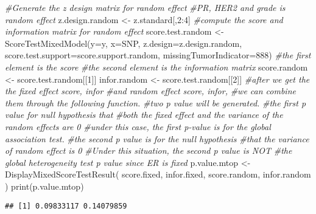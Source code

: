 \documentclass[11pt,]{article}
\newenvironment{Shaded}{\begin{snugshade}}{\end{snugshade}}
\newcommand{\AttributeTok}[1]{\textcolor[rgb]{0.77,0.63,0.00}{#1}}
\newcommand{\CommentTok}[1]{\textcolor[rgb]{0.56,0.35,0.01}{\textit{#1}}}
\newcommand{\DecValTok}[1]{\textcolor[rgb]{0.00,0.00,0.81}{#1}}
\newcommand{\FunctionTok}[1]{\textcolor[rgb]{0.00,0.00,0.00}{#1}}
\newcommand{\NormalTok}[1]{#1}
\newcommand{\OtherTok}[1]{\textcolor[rgb]{0.56,0.35,0.01}{#1}}
\newcommand{\SpecialCharTok}[1]{\textcolor[rgb]{0.00,0.00,0.00}{#1}}
\begin{document}
\begin{Shaded}
\begin{Highlighting}[]
\CommentTok{\#Generate the z design matrix for random effect}
\CommentTok{\#PR, HER2 and grade is random effect}
\NormalTok{z.design.random }\OtherTok{\textless{}{-}}\NormalTok{ z.standard[,}\DecValTok{2}\SpecialCharTok{:}\DecValTok{4}\NormalTok{]}
\CommentTok{\#compute the score and information matrix for random effect}
\NormalTok{score.test.random }\OtherTok{\textless{}{-}} \FunctionTok{ScoreTestMixedModel}\NormalTok{(}\AttributeTok{y=}\NormalTok{y,}
                                         \AttributeTok{x=}\NormalTok{SNP,}
                                         \AttributeTok{z.design=}\NormalTok{z.design.random,}
                                         \AttributeTok{score.test.support=}\NormalTok{score.support.random,}
                                         \AttributeTok{missingTumorIndicator=}\DecValTok{888}\NormalTok{)}
\CommentTok{\#the first element is the score}
\CommentTok{\#the second element is the information matrix}
\NormalTok{score.random }\OtherTok{\textless{}{-}}\NormalTok{ score.test.random[[}\DecValTok{1}\NormalTok{]]}
\NormalTok{infor.random }\OtherTok{\textless{}{-}}\NormalTok{ score.test.random[[}\DecValTok{2}\NormalTok{]]}
\CommentTok{\#after we get the the fixed effect score, infor }
\CommentTok{\#and random effect score, infor, }
\CommentTok{\#we can combine them through the following function. }
\CommentTok{\#two p value will be generated.}
\CommentTok{\#the first p value for null hypothesis that}
\CommentTok{\#both the fixed effect and the variance of the random effects are 0}
\CommentTok{\#under this case, the first p{-}value is for the global association test.}
\CommentTok{\#the second p value is for the null hypothesis }
\CommentTok{\#that the variance of random effect is 0}
\CommentTok{\#Under this situation, the second p value is NOT }
\CommentTok{\#the global heterogeneity test p value since ER is fixed}
\NormalTok{p.value.mtop }\OtherTok{\textless{}{-}} \FunctionTok{DisplayMixedScoreTestResult}\NormalTok{(}
\NormalTok{  score.fixed,}
\NormalTok{  infor.fixed,}
\NormalTok{  score.random,}
\NormalTok{  infor.random}
\NormalTok{)  }
\FunctionTok{print}\NormalTok{(p.value.mtop)}
\end{Highlighting}
\end{Shaded}

\begin{verbatim}
## [1] 0.09833117 0.14079859
\end{verbatim}
\end{document}
